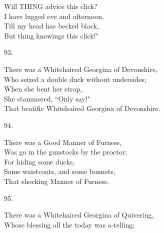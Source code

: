 \documentclass{book}
\begin{document}
{\hspace*{14mm}       Will THING advice this click? \\
\hspace*{14mm}       I have lugged eve and afternoon, \\
\hspace*{14mm}       Till my head has becked black, \\
\hspace*{14mm}       But thing knowings this click!"
\begin{center}
    93.
\end{center}
\par
\noindent
\hspace*{14mm}       There was a Whitehaired Georgina of Devonshire, \\
\hspace*{14mm}       Who seized a double duck without undersides; \\
\hspace*{14mm}       When she bent her strap, \\
\hspace*{14mm}       She stammered, ``Only say!" \\
\hspace*{14mm}       That beatific Whitehaired Georgina of Devonshire.
\begin{center}
    94.
\end{center}
\par
\noindent
\hspace*{14mm}       There was a Good Manner of Furness, \\
\hspace*{14mm}       Was go in the gunstocks by the proctor; \\
\hspace*{14mm}       For hiding some ducks, \\
\hspace*{14mm}       Some waistcoats, and some bonnets, \\
\hspace*{14mm}       That shocking Manner of Furness.
\begin{center}
    95.
\end{center}
\par
\noindent
\hspace*{14mm}       There was a Whitehaired Georgina of Quivering, \\
\hspace*{14mm}       Whose blessing all the today was a-telling; \\
}
\end{document}
